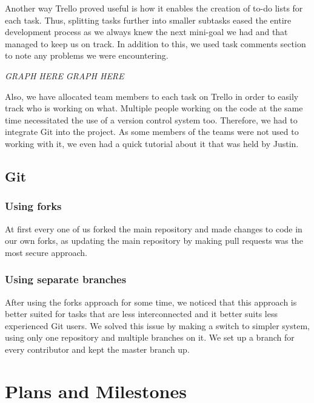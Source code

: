 \documentclass[12pt,oneside]{article}
\begin{document}
		Another way Trello proved useful is how it enables the creation of to-do lists for each task. Thus, splitting tasks further into smaller subtasks eased the entire development process as we always knew the next mini-goal we had and that managed to keep us on track. In addition to this, we used task comments section to note any problems we were encountering.
		
		\emph{GRAPH HERE}\newline
		\emph{GRAPH HERE}
		
		Also, we have allocated team members to each task on Trello in order to easily track who is working on what. Multiple people working on the code at the same time necessitated the use of a version control system too. Therefore, we had to integrate Git into the project. As some members of the teams were not used to working with it, we even had a quick tutorial about it that was held by Justin.
	\subsection{Git}
		\subsubsection{Using forks}
			At first every one of us forked the main repository and made changes to code in our own forks, as updating the main repository by making pull requests was the most secure approach.
		\subsubsection{Using separate branches}
			After using the forks approach for some time, we noticed that this approach is better suited for tasks that are less interconnected and it better suits less experienced Git users. We solved this issue by making a switch to simpler system, using only one repository and multiple branches on it. We set up a branch for every contributor and kept the master branch up.
			
	\section{Plans and Milestones}
\end{document}
